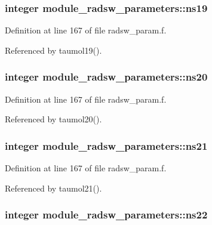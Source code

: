 \subsubsection[{\texorpdfstring{ns19}{ns19}}]{\setlength{\rightskip}{0pt plus 5cm}integer module\+\_\+radsw\+\_\+parameters\+::ns19}\hypertarget{group__module__radsw__main_gab666e8da69b308ae5b09e187b8153518}{}\label{group__module__radsw__main_gab666e8da69b308ae5b09e187b8153518}


Definition at line 167 of file radsw\+\_\+param.\+f.



Referenced by taumol19().

\subsubsection[{\texorpdfstring{ns20}{ns20}}]{\setlength{\rightskip}{0pt plus 5cm}integer module\+\_\+radsw\+\_\+parameters\+::ns20}\hypertarget{group__module__radsw__main_gad63ddbb0abcaeda56220a624a62a7336}{}\label{group__module__radsw__main_gad63ddbb0abcaeda56220a624a62a7336}


Definition at line 167 of file radsw\+\_\+param.\+f.



Referenced by taumol20().

\subsubsection[{\texorpdfstring{ns21}{ns21}}]{\setlength{\rightskip}{0pt plus 5cm}integer module\+\_\+radsw\+\_\+parameters\+::ns21}\hypertarget{group__module__radsw__main_ga63b1d13965acda2c131123f67fe456ea}{}\label{group__module__radsw__main_ga63b1d13965acda2c131123f67fe456ea}


Definition at line 167 of file radsw\+\_\+param.\+f.



Referenced by taumol21().

\subsubsection[{\texorpdfstring{ns22}{ns22}}]{\setlength{\rightskip}{0pt plus 5cm}integer module\+\_\+radsw\+\_\+parameters\+::ns22}\hypertarget{group__module__radsw__main_ga194fffaa7b04c97d8133a9e5686e94d5}{}\label{group__module__radsw__main_ga194fffaa7b04c97d8133a9e5686e94d5}


